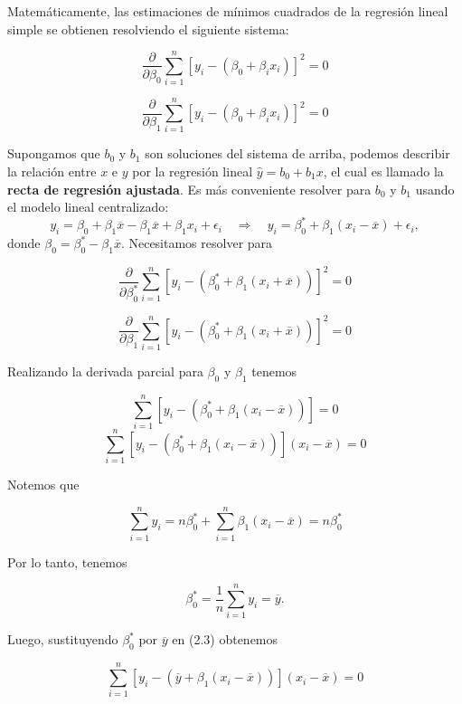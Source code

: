 Matemáticamente, las estimaciones de mínimos cuadrados de la regresión lineal simple se obtienen resolviendo el siguiente sistema:

\begin{equation}
    \dfrac{\partial}{\partial\beta_0}\sum_{i=1}^n \left[y_i-\left(\beta_0+\beta_ix_i\right)\right]^2=0
\end{equation}

\begin{equation}
    \dfrac{\partial}{\partial\beta_1}\sum_{i=1}^n \left[y_i-\left(\beta_0+\beta_ix_i\right)\right]^2=0
\end{equation}
\vspace{0.5cm}

Supongamos que $b_0$ y $b_1$ son soluciones del sistema de arriba, podemos describir la relación entre $x$ e $y$ por la regresión lineal $\hat{y}=b_0+b_1x$, el cual es llamado la \textbf{recta de regresión ajustada}. Es más conveniente resolver para $b_0$ y $b_1$ usando el modelo lineal centralizado:
$$y_i= \beta_0+\beta_1\overline{x}-\beta_1\overline{x}+\beta_1x_i+\epsilon_i \quad \Rightarrow \quad y_i=\beta_0^* + \beta_1(x_i-\overline{x})+\epsilon_i,$$
donde $\beta_0=\beta_0^*-\beta_1\overline{x}$. Necesitamos resolver para

$$\dfrac{\partial}{\partial\beta_0^*}\sum_{i=1}^n \left[y_i-\left(\beta_0^*+\beta_1(x_i+\overline{x})\right)\right]^2=0$$

$$\dfrac{\partial}{\partial\beta_1}\sum_{i=1}^n \left[y_i-\left(\beta_0^*+\beta_1(x_i+\overline{x})\right)\right]^2=0$$

Realizando la derivada parcial para $\beta_0$ y $\beta_1$ tenemos

$$\sum_{i=1}^n \left[y_i-(\beta_0^* + \beta_1(x_i-\overline{x}))\right]=0$$
$$\sum_{i=1}^n \left[y_i-(\beta_0^* + \beta_1(x_i-\overline{x}))\right](x_i-\overline{x})=0$$

Notemos que

\begin{equation}
    \sum_{i=1}^n y_i= n\beta_0^*+\sum_{i=1}^n \beta_1(x_i-\overline{x})=n\beta_0^*
\end{equation}

Por lo tanto, tenemos 

$$\beta_0^*=\dfrac{1}{n}\sum\limits_{i=1}^n y_i=\overline{y}.$$

Luego, sustituyendo $\beta_0^*$ por $\overline{y}$ en (2.3) obtenemos

$$\sum_{i=1}^n \left[y_i-(\overline{y} + \beta_1(x_i-\overline{x}))\right](x_i-\overline{x})=0$$

